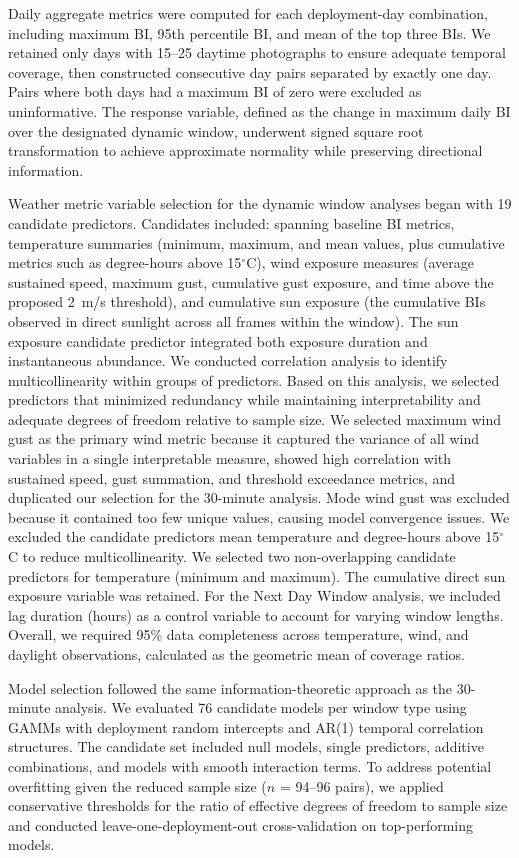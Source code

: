 \documentclass[insects,article,submit,pdftex,moreauthors]{Definitions/mdpi}
\begin{document}
Daily aggregate metrics were computed for each deployment-day combination, including maximum BI, 95th percentile BI, and mean of the top three BIs. We retained only days with 15--25 daytime photographs to ensure adequate temporal coverage, then constructed consecutive day pairs separated by exactly one day. Pairs where both days had a maximum BI of zero were excluded as uninformative. The response variable, defined as the change in maximum daily BI over the designated dynamic window, underwent signed square root transformation to achieve approximate normality while preserving directional information.

Weather metric variable selection for the dynamic window analyses began with 19 candidate predictors. Candidates included: spanning baseline BI metrics, temperature summaries (minimum, maximum, and mean values, plus cumulative metrics such as degree-hours above 15$^{\circ}$C), wind exposure measures (average sustained speed, maximum gust, cumulative gust exposure, and time above the proposed 2~m/s threshold), and cumulative sun exposure (the cumulative BIs observed in direct sunlight across all frames within the window). The sun exposure candidate predictor integrated both exposure duration and instantaneous abundance. We conducted correlation analysis to identify multicollinearity within groups of predictors. Based on this analysis, we selected predictors that minimized redundancy while maintaining interpretability and adequate degrees of freedom relative to sample size. We selected maximum wind gust as the primary wind metric because it captured the variance of all wind variables in a single interpretable measure, showed high correlation with sustained speed, gust summation, and threshold exceedance metrics, and duplicated our selection for the 30-minute analysis. Mode wind gust was excluded because it contained too few unique values, causing model convergence issues. We excluded the candidate predictors mean temperature and degree-hours above 15$^{\circ}$C to reduce multicollinearity. We selected two non-overlapping candidate predictors for temperature (minimum and maximum). The cumulative direct sun exposure variable was retained. For the Next Day Window analysis, we included lag duration (hours) as a control variable to account for varying window lengths. Overall, we required 95\% data completeness across temperature, wind, and daylight observations, calculated as the geometric mean of coverage ratios.

Model selection followed the same information-theoretic approach as the 30-minute analysis. We evaluated 76 candidate models per window type using GAMMs with deployment random intercepts and AR(1) temporal correlation structures. The candidate set included null models, single predictors, additive combinations, and models with smooth interaction terms. To address potential overfitting given the reduced sample size ($n$ = 94--96 pairs), we applied conservative thresholds for the ratio of effective degrees of freedom to sample size and conducted leave-one-deployment-out cross-validation on top-performing models.
\end{document}
